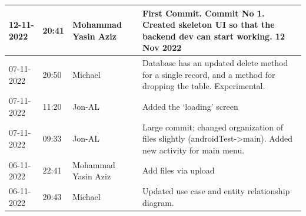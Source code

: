 \documentclass[11pt]{article}
\begin{document}
\begin{center}
\begin{longtable}{|p{2cm}|l|p{2cm}|p{10.5cm}|}
            12-11-2022                                 & 20:41                              & Mohammad Yasin Aziz                     & First Commit. Commit No 1. Created skeleton UI so that the backend dev can start working. 12 Nov 2022                                                                                                                                                                                                        \\ \hline
            07-11-2022                                 & 20:50                              & Michael                                 & Database has an updated delete method for a single record, and a method for dropping the table. Experimental.                                                                                                                                                                                                \\ \hline
            07-11-2022                                 & 11:20                              & Jon-AL                                  & Added the `loading' screen                                                                                                                                                                                                                                                                                   \\ \hline
            07-11-2022                                 & 09:33                              & Jon-AL                                  & Large commit; changed organization of files slightly (androidTest->main). Added new activity for main menu.                                                                                                                                                                                                  \\ \hline
            06-11-2022                                 & 22:41                              & Mohammad Yasin Aziz                     & Add files via upload                                                                                                                                                                                                                                                                                         \\ \hline
            06-11-2022                                 & 20:43                              & Michael                                 & Updated use case and entity relationship diagram.                                                                                                                                                                                                                                                            \\ \hline

\end{longtable}
\end{center}
\end{document}
